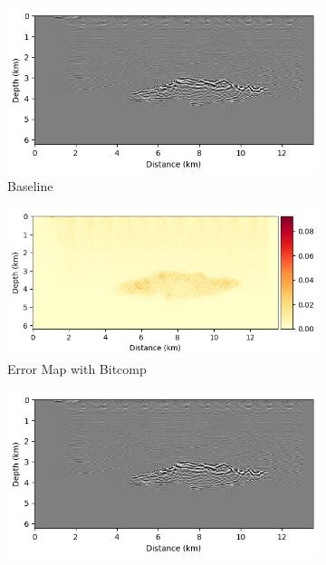\documentclass[Ingles]{ic-tese-v3}
\begin{document}
\begin{figure}[]
    \centering
    \begin{subfigure}{0.49\textwidth}
        \includegraphics[width=\textwidth,trim={4px 0 0 0}, clip]{figures/quality/render_baseline_salt.png}
        \caption{Baseline}
        \label{fig:render_baseline_salt}
    \end{subfigure}
    \hfill
    \begin{subfigure}{0.49\textwidth}
        \includegraphics[width=\textwidth,trim={35px 0 8px 0px}, clip]{figures/quality/errormap_bitcomp_salt.png}
        \caption{Error Map with Bitcomp}
        \label{fig:errmap_salt}
    \end{subfigure}
    \hfill
    \begin{subfigure}{0.49\textwidth}
        \includegraphics[width=\textwidth,trim={4px 0 0 0}, clip]{figures/quality/render_cuzfp_salt.png}

\end{subfigure}
\end{figure}
\end{document}

